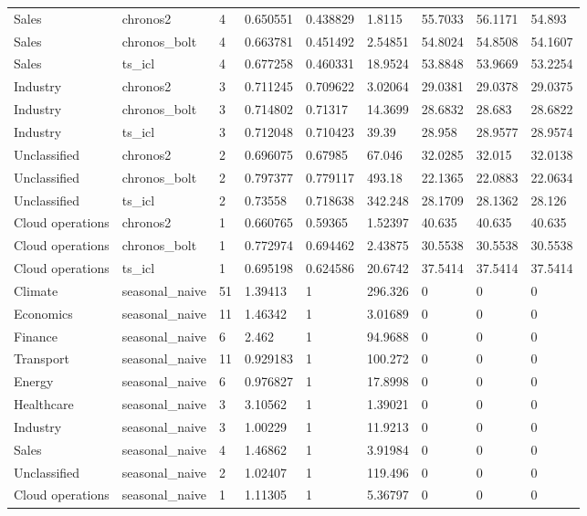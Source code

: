 \begin{tabular}{lllllllll}
Sales & chronos2 & 4 & 0.650551 & 0.438829 & 1.8115 & 55.7033 & 56.1171 & 54.893 \\
Sales & chronos\_bolt & 4 & 0.663781 & 0.451492 & 2.54851 & 54.8024 & 54.8508 & 54.1607 \\
Sales & ts\_icl & 4 & 0.677258 & 0.460331 & 18.9524 & 53.8848 & 53.9669 & 53.2254 \\
Industry & chronos2 & 3 & 0.711245 & 0.709622 & 3.02064 & 29.0381 & 29.0378 & 29.0375 \\
Industry & chronos\_bolt & 3 & 0.714802 & 0.71317 & 14.3699 & 28.6832 & 28.683 & 28.6822 \\
Industry & ts\_icl & 3 & 0.712048 & 0.710423 & 39.39 & 28.958 & 28.9577 & 28.9574 \\
Unclassified & chronos2 & 2 & 0.696075 & 0.67985 & 67.046 & 32.0285 & 32.015 & 32.0138 \\
Unclassified & chronos\_bolt & 2 & 0.797377 & 0.779117 & 493.18 & 22.1365 & 22.0883 & 22.0634 \\
Unclassified & ts\_icl & 2 & 0.73558 & 0.718638 & 342.248 & 28.1709 & 28.1362 & 28.126 \\
Cloud operations & chronos2 & 1 & 0.660765 & 0.59365 & 1.52397 & 40.635 & 40.635 & 40.635 \\
Cloud operations & chronos\_bolt & 1 & 0.772974 & 0.694462 & 2.43875 & 30.5538 & 30.5538 & 30.5538 \\
Cloud operations & ts\_icl & 1 & 0.695198 & 0.624586 & 20.6742 & 37.5414 & 37.5414 & 37.5414 \\
Climate & seasonal\_naive & 51 & 1.39413 & 1 & 296.326 & 0 & 0 & 0 \\
Economics & seasonal\_naive & 11 & 1.46342 & 1 & 3.01689 & 0 & 0 & 0 \\
Finance & seasonal\_naive & 6 & 2.462 & 1 & 94.9688 & 0 & 0 & 0 \\
Transport & seasonal\_naive & 11 & 0.929183 & 1 & 100.272 & 0 & 0 & 0 \\
Energy & seasonal\_naive & 6 & 0.976827 & 1 & 17.8998 & 0 & 0 & 0 \\
Healthcare & seasonal\_naive & 3 & 3.10562 & 1 & 1.39021 & 0 & 0 & 0 \\
Industry & seasonal\_naive & 3 & 1.00229 & 1 & 11.9213 & 0 & 0 & 0 \\
Sales & seasonal\_naive & 4 & 1.46862 & 1 & 3.91984 & 0 & 0 & 0 \\
Unclassified & seasonal\_naive & 2 & 1.02407 & 1 & 119.496 & 0 & 0 & 0 \\
Cloud operations & seasonal\_naive & 1 & 1.11305 & 1 & 5.36797 & 0 & 0 & 0 \\
\bottomrule
\end{tabular}
